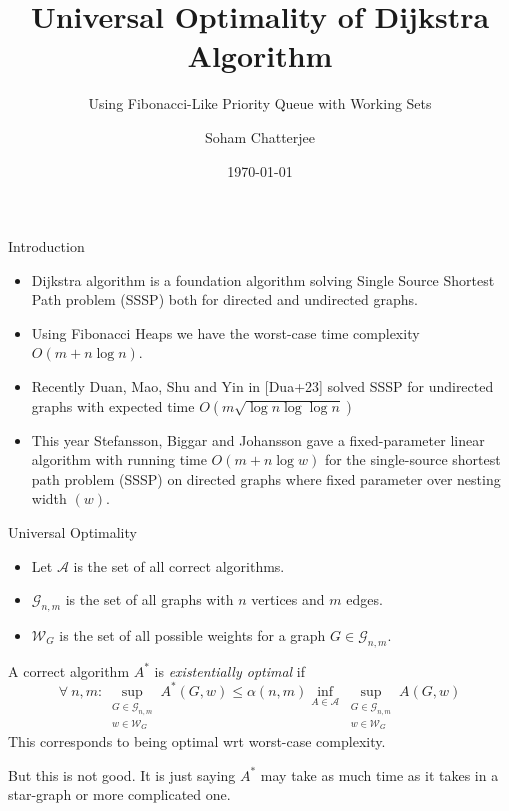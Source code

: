 \documentclass[10pt]{beamer}
\title{Universal Optimality of Dijkstra Algorithm}
\subtitle{Using Fibonacci-Like Priority Queue with Working Sets}
\date{\today}
\author{Soham Chatterjee}
\institute{Oral Qualifier, STCS}
\begin{document}
\maketitle


\begin{frame}{Introduction}
	\begin{itemize}
		\item Dijkstra algorithm is a foundation algorithm solving Single Source Shortest Path problem (SSSP) both for directed and undirected graphs.
		\item Using Fibonacci Heaps we have the worst-case time complexity $O(m+n\log n)$. \pause
		\item Recently Duan, Mao, Shu and Yin in [Dua+23] solved SSSP for undirected graphs with expected time $O(m\sqrt{\log n\log\log n})$\pause
		\item This year Stefansson, Biggar and  Johansson gave a fixed-parameter linear algorithm with running time $O(m+n\log w)$ for the single-source shortest path problem (SSSP) on directed graphs where fixed parameter over nesting width $(w)$.
	\end{itemize}
\end{frame}
\begin{frame}{Universal Optimality}
	\begin{itemize}
		\item Let $\mathcal{A}$ is the set of all correct algorithms.
		\item $\mathcal{G}_{n,m}$ is the set of all graphs with $n$ vertices and $m$ edges.
		\item $\mathcal{W}_G$ is the set of all possible weights for a graph $G\in\mathcal{G}_{n,m}$.
	\end{itemize} \pause\vfill
	A correct algorithm $A^*$ is \emph{existentially optimal} if $$\forall\ n,m: \sup\limits_{\substack{G\in\mathcal{G}_{n,m}\\ w\in \mathcal{W}_G} }A^*(G,w)\leq \alpha(n,m)\inf\limits_{A\in \mathcal{A}}\sup\limits_{\substack{G\in\mathcal{G}_{n,m}\\ w\in \mathcal{W}_G} } A(G,w)$$This corresponds to being optimal wrt worst-case complexity.\pause  \setlength{\parindent}{1cm}\vfill

	But this is not good. It is just saying $A^*$ may take as much time as it takes in a star-graph or more complicated one.
\end{frame}
\end{document}
